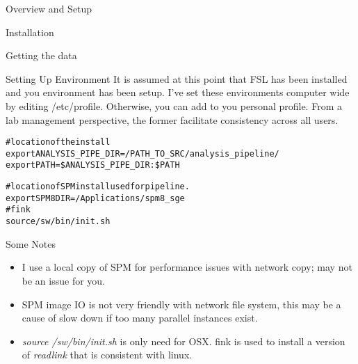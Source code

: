\documentclass[]{report}
\begin{document}
\begin{chapter}{Overview and Setup}
\begin{section}{Installation}
\begin{subsection}{Getting the data}
\end{subsection}
\begin{subsection}{Setting Up Environment }
It is assumed at this point that FSL has been installed and you environment has been setup. I've set these environments computer wide by editing /etc/profile. Otherwise, you can add to you personal profile. From a lab management perspective, the former facilitate consistency across all users.

\begin{alltt}
#location of the install 
export ANALYSIS\_PIPE\_DIR=/PATH\_TO\_SRC/analysis\_pipeline/
export PATH=\${ANALYSIS_PIPE_DIR}:\${PATH}

#location of SPM install used for pipeline. 
export SPM8DIR=/Applications/spm8\_sge
#fink
source /sw/bin/init.sh
\end{alltt}
{Some Notes}
\begin{itemize}
	\item  I use a local copy of SPM for performance issues with network copy; may not be an issue for you.
	\item  SPM image IO is not very friendly with network file system, this may be a cause of slow down if too many parallel instances exist.
	\item {\it source /sw/bin/init.sh} is only need for OSX. fink is used to install a version of {\it readlink} that is consistent with linux.  
\end{itemize}
\end{subsection}

\end{section}



\end{chapter}
\end{document}
